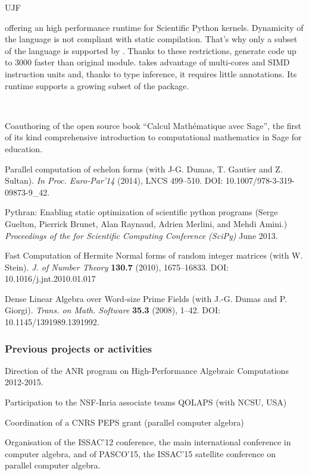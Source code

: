 \begin{sitedescription}{UJF}
\begin{description}
\begin{description}
    offering an high performance runtime for Scientific Python kernels. Dynamicity of
    the \Python language is not compliant with static compilation. That's why only
    a subset of the \Python language is supported by \Pythran. Thanks to these
    restrictions, \Pythran generate code up to 3000 faster than original module.
    \Pythran takes advantage of multi-cores and SIMD instruction units and,
    thanks to type inference, it requires little annotations. Its runtime
    supports a growing subset of the \Numpy package.
  \end{description}
\item[Selected Publications]\ 
\medskip\noindent
\begin{compactenum}[1.]
\item Coauthoring of the open source book ``Calcul Mathématique avec
  Sage'', the first of its kind comprehensive introduction to
  computational mathematics in Sage for education.

\item Parallel computation of echelon forms (with J-G. Dumas, T. Gautier and Z. Sultan). 
\emph{In Proc. Euro-Par'14}  (2014),  LNCS 499--510. DOI: 10.1007/978-3-319-09873-9\_42.

\item Pythran: Enabling static optimization of scientific python programs
  (Serge Guelton, Pierrick Brunet, Alan Raynaud, Adrien Merlini, and Mehdi Amini.)
\emph{Proceedings of the \Python for Scientific Computing Conference (SciPy)} June 2013.

\item Fast Computation of Hermite Normal forms of random integer matrices (with
W. Stein).
\emph{J. of Number Theory} {\bf{130.7}} (2010), 1675--16833. DOI: 10.1016/j.jnt.2010.01.017

\item Dense Linear Algebra over Word-size Prime Fields (with J.-G. Dumas and P. Giorgi). 
\emph{Trans. on Math. Software} {\bf{35.3}} (2008), 1--42. DOI: 10.1145/1391989.1391992.
\end{compactenum}

\end{description}

\subsubsection*{Previous projects or activities}

\begin{compactenum}
\item Direction of the ANR program on High-Performance Algebraic
  Computations 2012-2015.
\item Participation to the NSF-Inria associate teams QOLAPS (with NCSU, USA)
\item Coordination of a CNRS PEPS grant (parallel computer algebra)
\item Organisation of the ISSAC'12 conference, the main
  international conference in computer algebra, and of PASCO'15, 
  the ISSAC'15 satellite conference on parallel computer algebra.
\end{compactenum}



\end{sitedescription}

